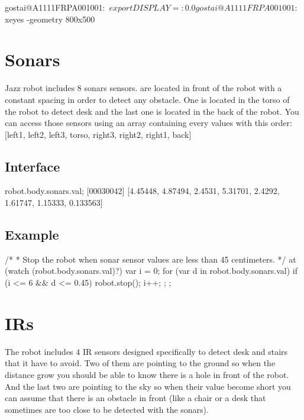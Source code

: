 \begin{shell}
gostai@A1111FRPA001001:~$ export DISPLAY=:0.0
gostai@A1111FRPA001001:~$ xeyes -geometry 800x500
\end{shell}%

\section{Sonars}

Jazz robot includes 8 sonars sensors.  are located in front of the robot
with a constant spacing in order to detect any obstacle. One is located in
the torso of the robot to detect desk and the last one is located in the
back of the robot.  You can access those sensors using an array containing
every values with this order: [left1, left2, left3, torso, right3, right2,
right1, back]

\subsection{\us Interface}

\begin{urbiunchecked}
robot.body.sonars.val;
[00030042] [4.45448, 4.87494, 2.4531, 5.31701, 2.4292, 1.61747, 1.15333, 0.133563]
\end{urbiunchecked}

\subsection{Example}
\begin{urbiunchecked}
/*
 * Stop the robot when sonar sensor values are less than 45 centimeters.
 */
at (watch (robot.body.sonars.val)?)
{
  var i = 0;
  for (var d in robot.body.sonars.val)
  {
    if (i <= 6 && d <= 0.45)
      robot.stop();
    i++;
  };
};
\end{urbiunchecked}


\section{IRs}

The robot includes 4 IR sensors designed specifically to detect desk and
stairs that it have to avoid. Two of them are pointing to the ground so when
the distance grow you should be able to know there is a hole in front of the
robot. And the last two are pointing to the sky so when their value become
short you can assume that there is an obstacle in front (like a chair or a
desk that sometimes are too close to be detected with the sonars).

